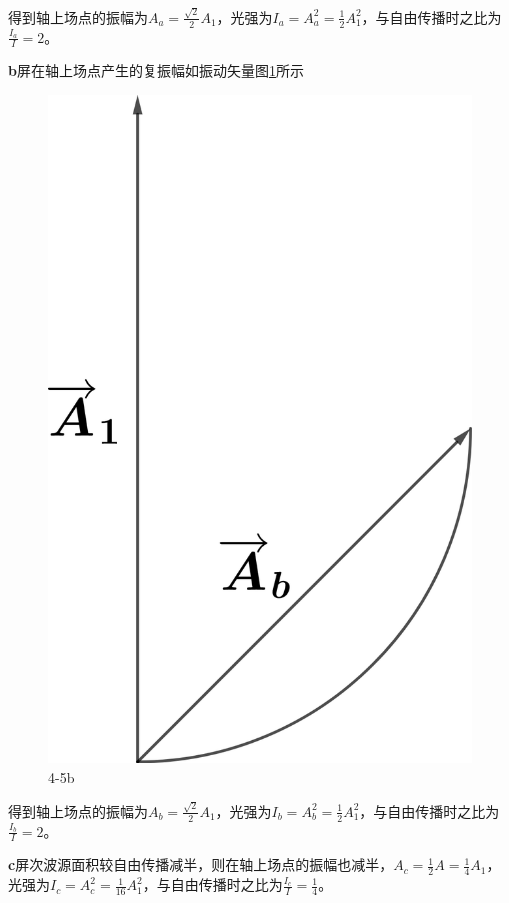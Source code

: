 \documentclass[10pt,a4paper]{article}
\begin{document}
\noindent 得到轴上场点的振幅为$A_a=\frac{\sqrt{2}}{2}A_1$，光强为$I_a=A_a^2=\frac{1}{2}A_1^2$，与自由传播时之比为$\frac{I_a}{I}=2$。

\textbf{b}屏在轴上场点产生的复振幅如振动矢量图\ref{OpticsHomework_6_4-5b}所示
\begin{figure}[h]
\centering
\includegraphics[scale=.1]{OpticsHomework_6_4-5b(tailored).png}
\caption{4-5b}\label{OpticsHomework_6_4-5b}
\end{figure}

\noindent 得到轴上场点的振幅为$A_b=\frac{\sqrt{2}}{2}A_1$，光强为$I_b=A_b^2=\frac{1}{2}A_1^2$，与自由传播时之比为$\frac{I_b}{I}=2$。

\textbf{c}屏次波源面积较自由传播减半，则在轴上场点的振幅也减半，$A_c=\frac{1}{2}A=\frac{1}{4}A_1$，光强为$I_c=A_c^2=\frac{1}{16}A_1^2$，与自由传播时之比为$\frac{I_c}{I}=\frac{1}{4}$。
\end{document}
